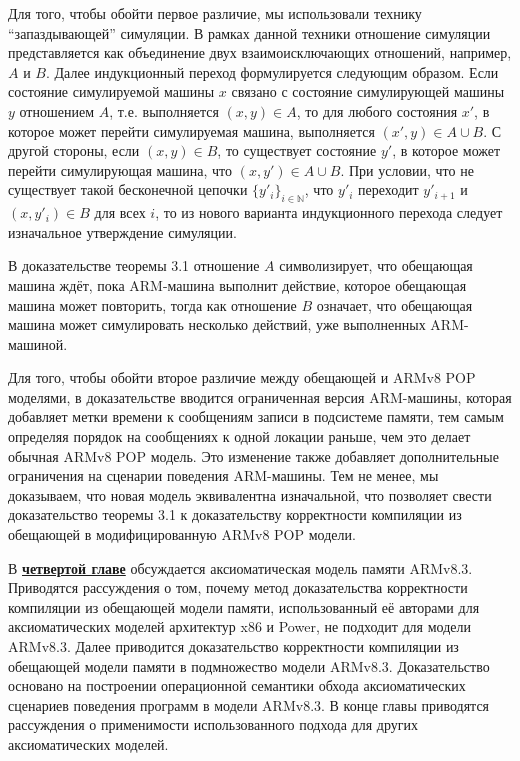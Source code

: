 Для того, чтобы обойти первое различие, мы использовали технику ``запаздывающей'' симуляции. В рамках данной техники отношение
симуляции представляется как объединение двух взаимоисключающих отношений, например, $A$ и $B$. Далее индукционный
переход формулируется следующим образом. Если состояние симулируемой машины $x$ связано с состояние симулирующей машины $y$ отношением $A$,
т.е. выполняется $(x,y) \in A$, то для любого состояния $x'$, в которое может перейти симулируемая машина, выполняется $(x', y) \in A \cup B$.
С другой стороны, если $(x, y) \in B$, то существует состояние $y'$, в которое может перейти симулирующая машина, что $(x, y') \in A \cup B$.
При условии, что не существует такой бесконечной цепочки $\{y'_i\}_{i \in \mathbb{N}}$, что $y'_i$ переходит $y'_{i+1}$ и $(x, y'_i) \in B$ для всех $i$,
то из нового варианта индукционного перехода следует изначальное утверждение симуляции.

В доказательстве теоремы 3.1 отношение $A$ символизирует, что обещающая машина ждёт, пока ARM-машина выполнит действие, которое обещающая
машина может повторить, тогда как отношение $B$ означает, что обещающая машина может симулировать несколько действий, уже выполненных ARM-машиной.

Для того, чтобы обойти второе различие между обещающей и ARMv8 POP моделями, в доказательстве вводится ограниченная версия ARM-машины,
которая добавляет метки времени к сообщениям записи в подсистеме памяти, тем самым определяя порядок на сообщениях к одной локации
раньше, чем это делает обычная ARMv8 POP модель. Это изменение также добавляет дополнительные ограничения на сценарии поведения ARM-машины.
Тем не менее, мы доказываем, что новая модель эквивалентна изначальной, что позволяет свести доказательство теоремы 3.1
к доказательству корректности компиляции из обещающей в модифицированную ARMv8 POP модели.

В \underline{\textbf{четвертой главе}} обсуждается аксиоматическая модель памяти ARMv8.3.
Приводятся рассуждения о том, почему метод доказательства корректности компиляции из
обещающей модели памяти, использованный её авторами для аксиоматических моделей архитектур x86 и Power,
не подходит для модели ARMv8.3. Далее приводится доказательство корректности компиляции из обещающей модели
памяти в подмножество модели ARMv8.3. Доказательство основано на построении операционной семантики обхода аксиоматических сценариев
поведения программ в модели ARMv8.3. В конце главы приводятся рассуждения о применимости использованного подхода для других
аксиоматических моделей.

